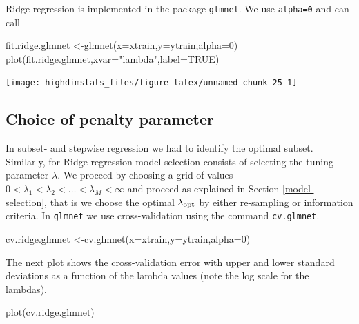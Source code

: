 \documentclass[
]{book}
\newenvironment{Shaded}{\begin{snugshade}}{\end{snugshade}}
\newcommand{\AttributeTok}[1]{\textcolor[rgb]{0.77,0.63,0.00}{#1}}
\newcommand{\ConstantTok}[1]{\textcolor[rgb]{0.00,0.00,0.00}{#1}}
\newcommand{\DecValTok}[1]{\textcolor[rgb]{0.00,0.00,0.81}{#1}}
\newcommand{\FunctionTok}[1]{\textcolor[rgb]{0.00,0.00,0.00}{#1}}
\newcommand{\NormalTok}[1]{#1}
\newcommand{\OtherTok}[1]{\textcolor[rgb]{0.56,0.35,0.01}{#1}}
\newcommand{\StringTok}[1]{\textcolor[rgb]{0.31,0.60,0.02}{#1}}
\begin{document}
Ridge regression is implemented in the package \texttt{glmnet}. We use \texttt{alpha=0} and can call

\begin{Shaded}
\begin{Highlighting}[]
\NormalTok{fit.ridge.glmnet }\OtherTok{\textless{}{-}}\FunctionTok{glmnet}\NormalTok{(}\AttributeTok{x=}\NormalTok{xtrain,}\AttributeTok{y=}\NormalTok{ytrain,}\AttributeTok{alpha=}\DecValTok{0}\NormalTok{) }
\FunctionTok{plot}\NormalTok{(fit.ridge.glmnet,}\AttributeTok{xvar=}\StringTok{"lambda"}\NormalTok{,}\AttributeTok{label=}\ConstantTok{TRUE}\NormalTok{)}
\end{Highlighting}
\end{Shaded}

\begin{center}\texttt{[image: highdimstats\_files/figure-latex/unnamed-chunk-25-1]} \end{center}

\hypertarget{choice-of-penalty-parameter}{%
\subsection{Choice of penalty parameter}\label{choice-of-penalty-parameter}}

In subset- and stepwise regression we had to identify the optimal subset. Similarly, for Ridge regression model selection consists of selecting the tuning parameter \(\lambda\). We proceed by choosing a grid of values \(0<\lambda_1<\lambda_2<\ldots<\lambda_M<\infty\) and proceed as explained in Section \ref{model-selection}, that is we choose the optimal \(\lambda_{\rm opt}\) by either re-sampling or information criteria. In \texttt{glmnet} we use cross-validation using the command \texttt{cv.glmnet}.

\begin{Shaded}
\begin{Highlighting}[]
\NormalTok{cv.ridge.glmnet }\OtherTok{\textless{}{-}}\FunctionTok{cv.glmnet}\NormalTok{(}\AttributeTok{x=}\NormalTok{xtrain,}\AttributeTok{y=}\NormalTok{ytrain,}\AttributeTok{alpha=}\DecValTok{0}\NormalTok{) }
\end{Highlighting}
\end{Shaded}

The next plot shows the cross-validation error with upper and lower standard deviations as a function of the lambda values (note the log scale for the lambdas).

\begin{Shaded}
\begin{Highlighting}[]
\FunctionTok{plot}\NormalTok{(cv.ridge.glmnet)}
\end{Highlighting}
\end{Shaded}
\end{document}
